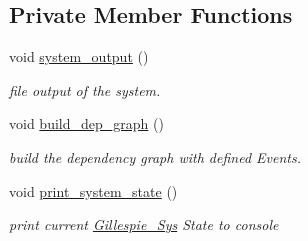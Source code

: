 \subsection*{Private Member Functions}
\begin{DoxyCompactItemize}
\item 
void \hyperlink{classnw_1_1_gillespie___sys_a48bc0eec3fc239802276ea1499326352}{system\+\_\+output} ()
\begin{DoxyCompactList}\small\item\em file output of the system. \end{DoxyCompactList}\item 
void \hyperlink{classnw_1_1_gillespie___sys_a52f0966bbf0a561851a4e8cb52e07f51}{build\+\_\+dep\+\_\+graph} ()
\begin{DoxyCompactList}\small\item\em build the dependency graph with defined Events. \end{DoxyCompactList}\item 
void \hyperlink{classnw_1_1_gillespie___sys_afb3cc7c5515ff9646fa3ecc9c4a44e61}{print\+\_\+system\+\_\+state} ()
\begin{DoxyCompactList}\small\item\em print current \hyperlink{classnw_1_1_gillespie___sys}{Gillespie\+\_\+\+Sys} State to console \end{DoxyCompactList}\end{DoxyCompactItemize}
